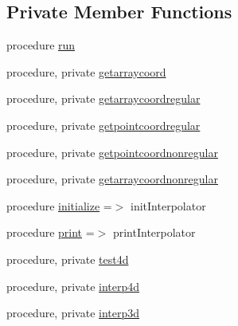 \subsection*{Private Member Functions}
\begin{DoxyCompactItemize}
\item 
procedure \mbox{\hyperlink{structinterpolator__mod_1_1interpolator__class_a1080aca342174069db9c5639853d5dc0}{run}}
\item 
procedure, private \mbox{\hyperlink{structinterpolator__mod_1_1interpolator__class_a63c210046b0aaacf729778f802335e3b}{getarraycoord}}
\item 
procedure, private \mbox{\hyperlink{structinterpolator__mod_1_1interpolator__class_a6149cbafca4f69609a43694e66c1e8f4}{getarraycoordregular}}
\item 
procedure, private \mbox{\hyperlink{structinterpolator__mod_1_1interpolator__class_a66fdc4b04c2bf6cb1304d379934e3830}{getpointcoordregular}}
\item 
procedure, private \mbox{\hyperlink{structinterpolator__mod_1_1interpolator__class_a1fcafed76162036798e88d6fb13dba2c}{getpointcoordnonregular}}
\item 
procedure, private \mbox{\hyperlink{structinterpolator__mod_1_1interpolator__class_acd8ed0dfedb43607ec182191ea953556}{getarraycoordnonregular}}
\item 
procedure \mbox{\hyperlink{structinterpolator__mod_1_1interpolator__class_a6911f5a4e2cbe3fcd8fbfce906429436}{initialize}} =$>$ init\+Interpolator
\item 
procedure \mbox{\hyperlink{structinterpolator__mod_1_1interpolator__class_a4b3112a37f09901a223d8cc3d81be4dd}{print}} =$>$ print\+Interpolator
\item 
procedure, private \mbox{\hyperlink{structinterpolator__mod_1_1interpolator__class_a2132c8be561d2afa1c369b9471a81e38}{test4d}}
\item 
procedure, private \mbox{\hyperlink{structinterpolator__mod_1_1interpolator__class_a150485e59a4b0edc41e730c116a37073}{interp4d}}
\item 
procedure, private \mbox{\hyperlink{structinterpolator__mod_1_1interpolator__class_a64a829fe34f0cf8a22f5b56718d7c51c}{interp3d}}
\end{DoxyCompactItemize}
